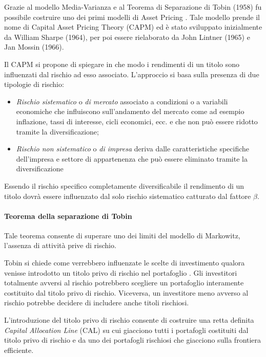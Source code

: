 Grazie al modello Media-Varianza e al Teorema di Separazione di Tobin  (1958) fu possibile costruire uno dei primi modelli di Asset Pricing \cite{fama_capital_2004}. Tale modello prende il nome di Capital Asset Pricing Theory (CAPM) ed è stato sviluppato inizialmente da William Sharpe (1964), per poi essere rielaborato da John Lintner (1965) e Jan  Mossin (1966).

Il CAPM si propone di spiegare in che modo i rendimenti di un titolo  sono influenzati dal rischio ad esso associato. L'approccio si basa sulla presenza di due tipologie di rischio:

\begin{itemize}
	\item \textit{Rischio sistematico} o \textit{di mercato} associato a condizioni o a variabili economiche che influiscono sull'andamento del mercato come ad esempio inflazione, tassi di interesse, cicli economici, ecc. e che non può essere ridotto tramite la diversificazione;
	\item \textit{Rischio non sistematico} o \textit{di impresa} deriva dalle caratteristiche specifiche dell'impresa e settore di appartenenza che può essere eliminato tramite la diversificazione
\end{itemize} 

Essendo il rischio specifico completamente diversificabile il rendimento di un titolo dovrà essere influenzato dal solo rischio sistematico catturato dal fattore $\beta$. 


\paragraph{Teorema della separazione di Tobin}
Tale teorema consente di superare uno dei limiti del modello di Markowitz, l'assenza di attività prive di rischio. 

Tobin si chiede come verrebbero influenzate le scelte di investimento qualora venisse introdotto un titolo privo di rischio nel portafoglio  \cite{tobin_liquidity_1958}  \cite{damodaran_investment_2002} \cite{ho_oxford_2004} \cite{jain_financial_2007}. Gli investitori totalmente avversi al rischio potrebbero scegliere un portafoglio interamente costituito dal titolo privo di rischio. Viceversa, un investitore meno avverso al rischio potrebbe decidere di includere anche titoli rischiosi. 

L'introduzione del titolo privo di rischio consente di costruire una retta definita \textit{Capital Allocation Line} (CAL) su cui giacciono tutti i portafogli costituiti dal titolo privo di rischio e da uno dei portafogli rischiosi che giacciono sulla frontiera efficiente.

